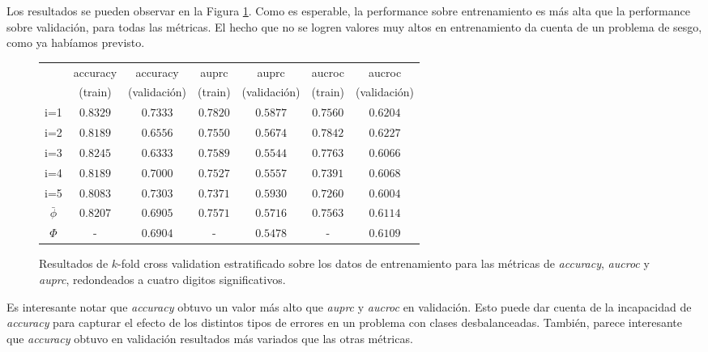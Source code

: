 Los resultados se pueden observar en la Figura \ref{metricas_modelo}. Como es esperable, la performance sobre entrenamiento es más alta que la performance sobre validación, para todas las métricas. El hecho que no se logren valores muy altos en entrenamiento da cuenta de un problema de sesgo, como ya habíamos previsto. 

\vspace{0.5em}
\begin{figure}[!htbp]
\begin{center}
\begin{tabular}{ |c|c|c|c|c|c|c| } 
\hline
            & accuracy  & accuracy      & auprc     & auprc         & aucroc   & aucroc      \\
            & (train)   & (validación)  & (train)   & (validación)  & (train)   & (validación) \\      
\hline
i=1         & $0.8329$  & $0.7333$      & $0.7820$  & $0.5877$      & $0.7560$  & $0.6204$ \\
i=2         & $0.8189$  & $0.6556$      & $0.7550$  & $0.5674$      & $0.7842$  & $0.6227$ \\
i=3         & $0.8245$  & $0.6333$      & $0.7589$  & $0.5544$      & $0.7763$  & $0.6066$ \\
i=4         & $0.8189$  & $0.7000$      & $0.7527$  & $0.5557$      & $0.7391$  & $0.6068$ \\
i=5         & $0.8083$  & $0.7303$      & $0.7371$  & $0.5930$      & $0.7260$  & $0.6004$ \\
$\bar\phi$  & $0.8207$  & $0.6905$      & $0.7571$  & $0.5716$      & $0.7563$  & $0.6114$ \\
$\Phi$      & -         & $0.6904$      & -         & $0.5478$      & -         & $0.6109$ \\
\hline
\end{tabular}
\end{center}
\caption{Resultados de $k$-fold cross validation estratificado sobre los datos de entrenamiento para las métricas de \textit{accuracy}, \textit{aucroc} y \textit{auprc}, redondeados a cuatro digitos significativos.}\label{metricas_modelo}
\end{figure}

Es interesante notar que \textit{accuracy} obtuvo un valor más alto que \textit{auprc} y \textit{aucroc} en validación. Esto puede dar cuenta de la incapacidad de \textit{accuracy} para capturar el efecto de los distintos tipos de errores en un problema con clases desbalanceadas. También, parece interesante que \textit{accuracy} obtuvo en validación resultados más variados que las otras métricas. 

